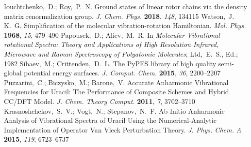 \documentclass[journal=jctcce]{achemso}
\begin{document}
\begin{mcitethebibliography}{79}
Iouchtchenko,~D.; Roy,~P.~N. {Ground states of linear rotor chains via the
  density matrix renormalization group}. \emph{J. Chem. Phys.} \textbf{2018},
  \emph{148}, 134115\relax
\mciteBstWouldAddEndPuncttrue
\mciteSetBstMidEndSepPunct{\mcitedefaultmidpunct}
{\mcitedefaultendpunct}{\mcitedefaultseppunct}\relax
\EndOfBibitem
{}
Watson,~J. K.~G. {Simplification of the molecular vibration-rotation
  Hamiltonian}. \emph{Mol. Phys.} \textbf{1968}, \emph{15}, 479--490\relax
\mciteBstWouldAddEndPuncttrue
\mciteSetBstMidEndSepPunct{\mcitedefaultmidpunct}
{\mcitedefaultendpunct}{\mcitedefaultseppunct}\relax
\EndOfBibitem
{}
Papousek,~D.; Aliev,~M.~R. In \emph{{Molecular Vibrational-rotational Spectra:
  Theory and Applications of High Resolution Infrared, Microwave and Raman
  Spectroscopy of Polyatomic Molecules}}; Ltd,~E.~S., Ed.; 1982\relax
\mciteBstWouldAddEndPuncttrue
\mciteSetBstMidEndSepPunct{\mcitedefaultmidpunct}
{\mcitedefaultendpunct}{\mcitedefaultseppunct}\relax
\EndOfBibitem
{}
Sibaev,~M.; Crittenden,~D.~L. {The PyPES library of high quality semi-global
  potential energy surfaces}. \emph{J. Comput. Chem.} \textbf{2015}, \emph{36},
  2200--2207\relax
\mciteBstWouldAddEndPuncttrue
\mciteSetBstMidEndSepPunct{\mcitedefaultmidpunct}
{\mcitedefaultendpunct}{\mcitedefaultseppunct}\relax
\EndOfBibitem
{}
Puzzarini,~C.; Biczysko,~M.; Barone,~V. {Accurate Anharmonic Vibrational
  Frequencies for Uracil: The Performance of Composite Schemes and Hybrid
  CC/DFT Model}. \emph{J. Chem. Theory Comput.} \textbf{2011}, \emph{7},
  3702--3710\relax
\mciteBstWouldAddEndPuncttrue
\mciteSetBstMidEndSepPunct{\mcitedefaultmidpunct}
{\mcitedefaultendpunct}{\mcitedefaultseppunct}\relax
\EndOfBibitem
{}
Krasnoshchekov,~S.~V.; Vogt,~N.; Stepanov,~N.~F. {Ab Initio Anharmonic Analysis
  of Vibrational Spectra of Uracil Using the Numerical-Analytic Implementation
  of Operator Van Vleck Perturbation Theory}. \emph{J. Phys. Chem. A}
  \textbf{2015}, \emph{119}, 6723--6737\relax
\mciteBstWouldAddEndPuncttrue
\mciteSetBstMidEndSepPunct{\mcitedefaultmidpunct}
{\mcitedefaultendpunct}{\mcitedefaultseppunct}\relax
\EndOfBibitem
{}

\end{mcitethebibliography}
\end{document}
